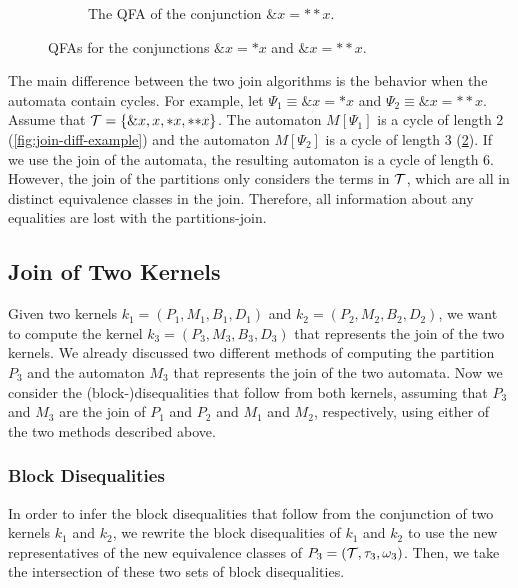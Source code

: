 \begin{example}
\begin{figure}
\begin{subfigure}{0.5\textwidth}
\begin{tikzpicture}[shorten >=1pt, node distance=3cm, on grid, auto, state/.style={rectangle, rounded corners, draw, inner sep=5pt, align=center}]
              \end{tikzpicture}


          \caption{The QFA of the conjunction $\&x = {*}{*}x$.}\label{fig:join-diff-example2}
        \end{subfigure}
        \caption[An example of quantitative finite automata.]{QFAs for the conjunctions $\&x = *x$ and $\&x = {*}{*}x$.}
    \end{figure}

    The main difference between the two join algorithms is the behavior when the automata contain cycles.
    For example, let $\Psi_1 \equiv \&x = *x$ and $\Psi_2 \equiv \&x = {*}{*}x$.
    Assume that $\T = \{\&x, x, *x, {*}{*}x\}$.
    The automaton $M[\Psi_1]$ is a cycle of length 2 (\cref{fig:join-diff-example}) and the automaton $M[\Psi_2]$ is a cycle of length 3 (\cref{fig:join-diff-example2}).
    If we use the join of the automata, the resulting automaton is a cycle of length 6.
    However, the join of the partitions only considers the terms in $\T$, which are all in distinct equivalence classes in the join.
    Therefore, all information about any equalities are lost with the partitions-join.

\end{example}

\subsection{Join of Two Kernels}

Given two kernels $k_1 = (P_1, M_1,B_1, D_1)$ and $k_2 = (P_2, M_2,B_2, D_2)$, we want to compute the kernel $k_3 = (P_3, M_3,B_3, D_3)$ that represents the join of the two kernels.
We already discussed two different methods of computing the partition $P_3$ and the automaton $M_3$ that represents the join of the two automata.
Now we consider the (block-)disequalities that follow from both kernels,
assuming that $P_3$ and $M_3$ are the join of $P_1$ and $P_2$ and $M_1$ and $M_2$, respectively,
using either of the two methods described above.

\subsubsection{Block Disequalities}

In order to infer the block disequalities that follow from the conjunction of two kernels $k_1$ and $k_2$,
we rewrite the block disequalities of $k_1$ and $k_2$ to use the new representatives of the new equivalence classes of $P_3 = (\T, \tau_3, \omega_3)$.
Then, we take the intersection of these two sets of block disequalities.

